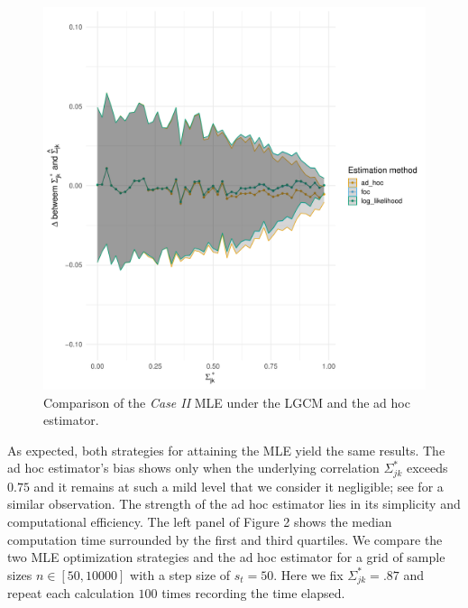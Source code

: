 \begin{change}
    \begin{figure}\label{fig:case2_comparison}
        \includegraphics[width=\textwidth]{Figures/case_2_difference.pdf}
        \caption{Comparison of the \textit{Case II} MLE under the LGCM and the ad hoc estimator.}
    \end{figure}

    As expected, both strategies for attaining the MLE yield the same results. The ad hoc estimator's bias shows only when the underlying correlation \(\Sigma^*_{jk}\) exceeds \(0.75\) and it remains at such a mild level that we consider it negligible; see \cite{Olsson82} for a similar observation. The strength of the ad hoc estimator lies in its simplicity and computational efficiency. The left panel of Figure 2 shows the median computation time surrounded by the first and third quartiles. We compare the two MLE optimization strategies and the ad hoc estimator for a grid of sample sizes \(n \in [50, 10000]\) with a step size of \(s_t = 50\). Here we fix \(\Sigma^*_{jk} = .87\) and repeat each calculation \(100\) times recording the time elapsed.


\end{change}
